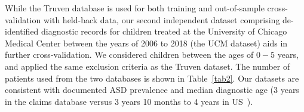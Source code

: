 \documentclass[3p,super,numbers,sort&compress,10pt]{elsarticle}
\begin{document}
While the Truven database is used for both training and out-of-sample cross-validation with held-back  data, our second independent dataset  comprising de-identified diagnostic records for children treated at the University of Chicago Medical Center between the years of 2006 to 2018 (the UCM dataset) aids in further cross-validation. We considered children between the ages of $0-5$ years, and  applied the same exclusion criteria as the Truven dataset.  The  number of  patients used from the two databases is shown in Table~\ref{tab2}. Our datasets are consistent with documented ASD prevalence and median diagnostic age (3 years in the claims database  versus 3 years 10 months to 4 years  in US~\cite{pmid29701730}). %
\end{document}
